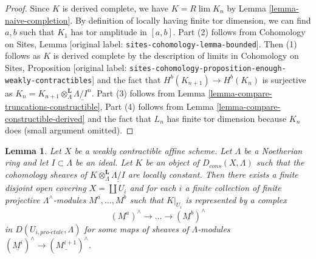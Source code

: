 \documentclass[10pt,a4paper]{article}
\theoremstyle{plain}
\newtheorem{lemma}[subsection]{Lemma}
\theoremstyle{definition}
\theoremstyle{remark}
\numberwithin{equation}{subsection}
\def\lim{\mathop{\mathrm{lim}}\nolimits}
\def\proetale{{pro\text{-}\acute{e}tale}}
\begin{document}
\begin{proof}
Since $K$ is derived complete, we have $K = R\lim K_n$ by
Lemma \ref{lemma-naive-completion}.
By definition of locally having finite tor dimension, we can find
$a, b$ such that $K_1$ has tor amplitude in $[a, b]$.
Part (2) follows from 
Cohomology on Sites, Lemma [original label: \nolinkurl{sites-cohomology-lemma-bounded}].
Then (1) follows as $K$ is derived complete by the description
of limits in
Cohomology on Sites, Proposition
[original label: \nolinkurl{sites-cohomology-proposition-enough-weakly-contractibles}]
and the fact that $H^b(K_{n + 1}) \to H^b(K_n)$ is surjective
as $K_n = K_{n + 1} \otimes^\mathbf{L}_\Lambda \underline{\Lambda/I^n}$.
Part (3) follows from
Lemma \ref{lemma-compare-truncations-constructible},
Part (4) follows from
Lemma \ref{lemma-compare-constructible-derived}
and the fact that $L_n$ has finite tor dimension because $K_n$ does
(small argument omitted).
\end{proof}

\begin{lemma}
\label{lemma-local-structure-constructible-complex}
Let $X$ be a weakly contractible affine scheme. Let $\Lambda$ be a Noetherian
ring and let $I \subset \Lambda$ be an ideal. Let $K$ be an object of
$D_{cons}(X, \Lambda)$ such that the cohomology sheaves of
$K \otimes_\Lambda^\mathbf{L} \underline{\Lambda/I}$ are locally
constant. Then there exists a finite disjoint open covering
$X = \coprod U_i$ and for each $i$ a finite collection of
finite projective $\Lambda^\wedge$-modules $M^a, \ldots, M^b$
such that $K|_{U_i}$ is represented by a complex
$$
(\underline{M^a})^\wedge \to \ldots \to (\underline{M^b})^\wedge
$$
in $D(U_{i, \proetale}, \Lambda)$ for some maps of sheaves of
$\Lambda$-modules $(\underline{M^i})^\wedge \to (\underline{M^{i + 1}})^\wedge$.
\end{lemma}
\end{document}
